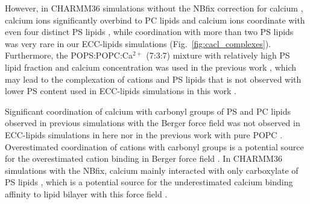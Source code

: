 \documentclass[journal=jpcbfk,manuscript=article]{achemso}
\begin{document}
However, in CHARMM36 simulations without the NBfix correction for calcium \cite{kim16},
calcium ions significantly overbind to PC lipids  \cite{catte16} and calcium ions coordinate
with even four distinct PS lipids \cite{hallock18}, while coordination with more than two PS lipids
was very rare in our ECC-lipids simulations (Fig.~\ref{fig:cacl_complexes}).
Furthermore, the POPS:POPC:Ca$^{2+}$ (7:3:7) mixture with relatively high
PS lipid fraction and calcium concentration was used in the previous work \cite{hallock18},
which may lead to the complexation of  cations and PS lipids that is
not observed with lower PS content used in ECC-lipids simulations in this work \cite{hauser77,kurland79,hauser85,feigenson86,mattai89,roux90,roux91}.


Significant coordination of calcium with carbonyl groups of PS and PC lipids observed in previous
simulations with the Berger force field \cite{melcrova16} %
was not observed in ECC-lipids simulations in here nor in the previous work with pure POPC \cite{melcr18}.
Overestimated coordination of cations with carbonyl groups is a potential source for
the overestimated cation binding in Berger force field \cite{catte16,NMRlipidsIV}. 
In CHARMM36 simulations with the NBfix, calcium mainly interacted with only
carboxylate of PS lipids  \cite{valentine18}, which is a potential source for the
underestimated calcium binding affinity to lipid bilayer with this force field \cite{NMRlipidsIV}. 

\end{document}
